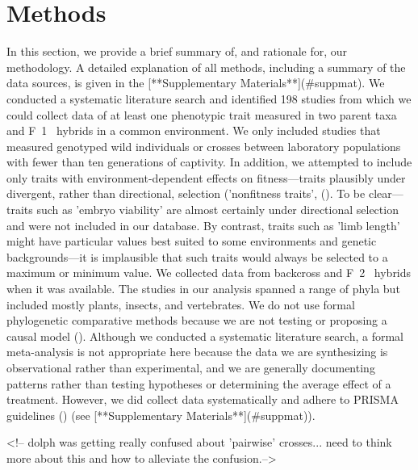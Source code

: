\documentclass[times, twoside, watermark]{zHenriquesLab-StyleBioRxiv}
\begin{document}
\section*{Methods}\label{METHODS:methods}
In this section, we provide a brief summary of, and rationale for, our methodology. A detailed explanation of all methods, including a summary of the data sources, is given in the [**Supplementary Materials**](#suppmat). We conducted a systematic literature search and identified 198 studies from which we could collect data of at least one phenotypic trait measured in two parent taxa and F~1~ hybrids in a common environment. We only included studies that measured genotyped wild individuals or crosses between laboratory populations with fewer than ten generations of captivity. In addition, we attempted to include only traits with environment-dependent effects on fitness---traits plausibly under divergent, rather than directional, selection ('nonfitness traits', (\citealt{Merila1999}). To be clear---traits such as 'embryo viability' are almost certainly under directional selection and were not included in our database. By contrast, traits such as 'limb length' might have particular values best suited to some environments and genetic backgrounds---it is implausible that such traits would always be selected to a maximum or minimum value. We collected data from backcross and F~2~ hybrids when it was available. The studies in our analysis spanned a range of phyla but included mostly plants, insects, and vertebrates. We do not use formal phylogenetic comparative methods because we are not testing or proposing a causal model (\citealt{Uyeda2018}). Although we conducted a systematic literature search, a formal meta-analysis is not appropriate here because the data we are synthesizing is observational rather than experimental, and we are generally documenting patterns rather than testing hypotheses or determining the average effect of a treatment. However, we did collect data systematically and adhere to PRISMA guidelines (\citealt{Moher2009}) (see [**Supplementary Materials**](#suppmat)). \par

<!-- dolph was getting really confused about 'pairwise' crosses... need to think more about this and how to alleviate the confusion.-->
\end{document}
